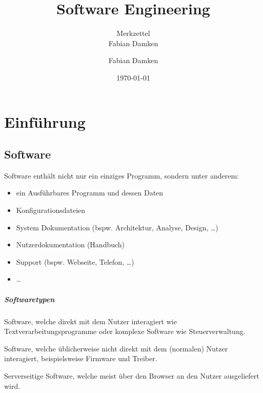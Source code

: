 \documentclass[a4paper, 11pt, accentcolor = tud3b]{tudreport}
\title{Software Engineering}
\subtitle{Merkzettel \\ Fabian Damken}
\author{Fabian Damken}
\date{\today}
\begin{document}
    \maketitle
    \tableofcontents
    \listoftodos

	\chapter{Einführung}
		\section{Software}
			Software enthält nicht nur ein einziges Programm, sondern unter anderem:
			\begin{itemize}
				\item ein Ausführbares Programm und dessen Daten
				\item Konfigurationsdateien
				\item System Dokumentation (bspw. Architektur, Analyse, Design, \dots)
				\item Nutzerdokumentation (Handbuch)
				\item Support (bspw. Webseite, Telefon, \dots)
				\item \dots
			\end{itemize}
			
			\paragraph{Softwaretypen}
				\begin{description}[leftmargin = 5cm]
					\item[Applikationssoftware] Software, welche direkt mit dem Nutzer interagiert wie Textverarbeitungsprogramme oder komplexe Software wie Steuerverwaltung.
					\item[Systemsoftware] Software, welche üblicherweise nicht direkt mit dem (normalen) Nutzer interagiert, beispielsweise Firmware und Treiber.
					\item[Software as a Service (SaaS)] Serverseitige Software, welche meist über den Browser an den Nutzer ausgeliefert wird.
				\end{description}
		
\end{document}
